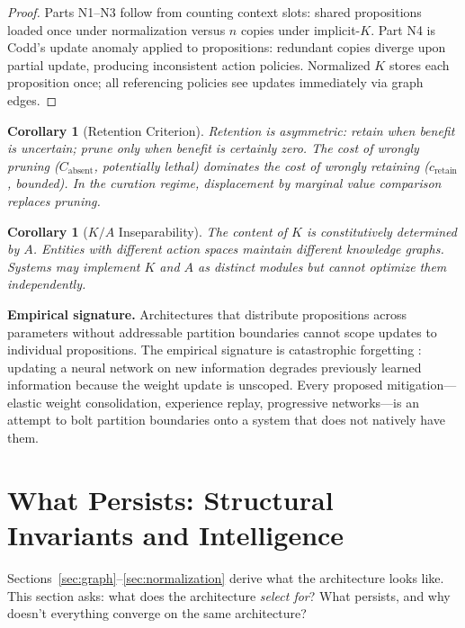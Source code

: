 \documentclass[11pt]{article}
\newtheorem{corollary}[theorem]{Corollary}
\theoremstyle{definition}
\theoremstyle{remark}
\begin{document}
\begin{proof}
Parts N1--N3 follow from counting context slots: shared propositions
loaded once under normalization versus $n$ copies under implicit-$K$.
Part N4 is Codd's update anomaly applied to propositions: redundant
copies diverge upon partial update, producing inconsistent action
policies. Normalized $K$ stores each proposition once; all referencing
policies see updates immediately via graph edges.
\end{proof}

\begin{corollary}[Retention Criterion]
\label{cor:retention}
Retention is asymmetric: retain when benefit is uncertain; prune only
when benefit is certainly zero. The cost of wrongly pruning
($C_{\text{absent}}$, potentially lethal) dominates the cost of wrongly
retaining ($c_{\text{retain}}$, bounded). In the curation regime,
displacement by marginal value comparison replaces pruning.
\end{corollary}

\begin{corollary}[$K/A$ Inseparability]
\label{cor:inseparability}
The content of $K$ is constitutively determined by $A$. Entities with
different action spaces maintain different knowledge graphs. Systems
may implement $K$ and $A$ as distinct modules but cannot optimize them
independently.
\end{corollary}

\textbf{Empirical signature.} Architectures that distribute propositions
across parameters without addressable partition boundaries cannot scope
updates to individual propositions. The empirical signature is
catastrophic forgetting \cite{McCloskey1989,Kirkpatrick2017}: updating a
neural network on new information degrades previously learned
information because the weight update is unscoped. Every proposed
mitigation---elastic weight consolidation, experience replay,
progressive networks---is an attempt to bolt partition boundaries onto
a system that does not natively have them.

\section{What Persists: Structural Invariants and Intelligence}
\label{sec:intelligence}

Sections~\ref{sec:graph}--\ref{sec:normalization} derive what the
architecture looks like. This section asks: what does the architecture
\emph{select for}? What persists, and why doesn't everything converge
on the same architecture?
\end{document}
